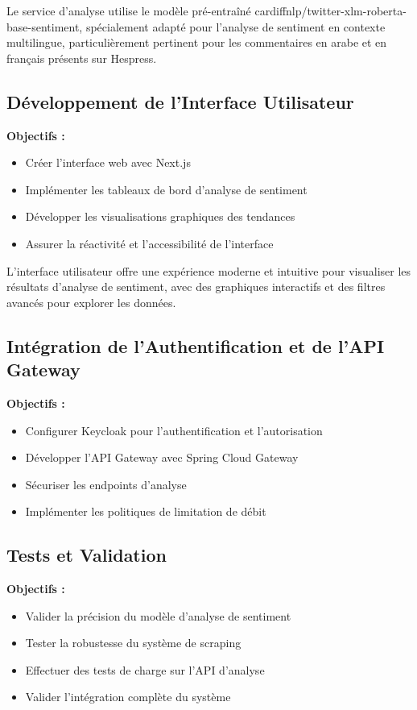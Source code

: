 Le service d'analyse utilise le modèle pré-entraîné cardiffnlp/twitter-xlm-roberta-base-sentiment, spécialement adapté pour l'analyse de sentiment en contexte multilingue, particulièrement pertinent pour les commentaires en arabe et en français présents sur Hespress.

\subsection{Développement de l'Interface Utilisateur}
\textbf{Objectifs :}
\begin{itemize}
    \item Créer l'interface web avec Next.js
    \item Implémenter les tableaux de bord d'analyse de sentiment
    \item Développer les visualisations graphiques des tendances
    \item Assurer la réactivité et l'accessibilité de l'interface
\end{itemize}

L'interface utilisateur offre une expérience moderne et intuitive pour visualiser les résultats d'analyse de sentiment, avec des graphiques interactifs et des filtres avancés pour explorer les données.

\subsection{Intégration de l'Authentification et de l'API Gateway}
\textbf{Objectifs :}
\begin{itemize}
    \item Configurer Keycloak pour l'authentification et l'autorisation
    \item Développer l'API Gateway avec Spring Cloud Gateway
    \item Sécuriser les endpoints d'analyse
    \item Implémenter les politiques de limitation de débit
\end{itemize}

\subsection{Tests et Validation}
\textbf{Objectifs :}
\begin{itemize}
    \item Valider la précision du modèle d'analyse de sentiment
    \item Tester la robustesse du système de scraping
    \item Effectuer des tests de charge sur l'API d'analyse
    \item Valider l'intégration complète du système
\end{itemize}

